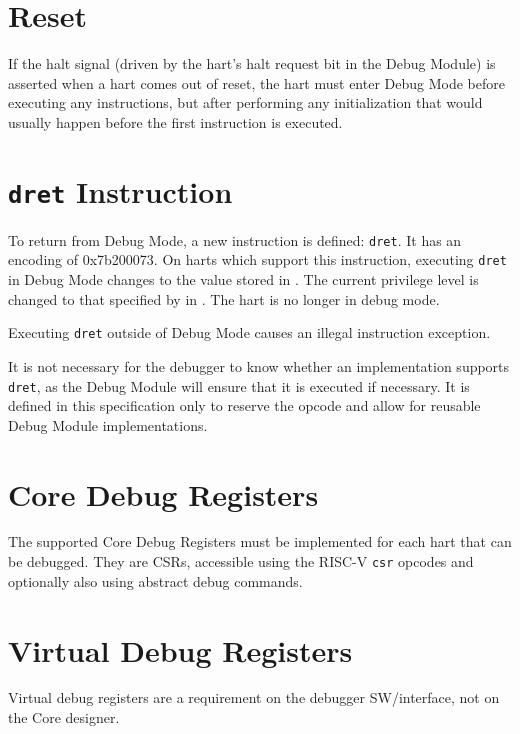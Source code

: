 \section{Reset}

If the halt signal (driven by the hart's halt request bit in the Debug Module)
is asserted when a hart comes out of reset, the hart must
enter Debug Mode before executing any instructions, but after performing any
initialization that would usually happen before the first instruction is
executed.

\section{{\tt dret} Instruction} \label{dret}

To return from Debug Mode, a new instruction is defined: {\tt dret}. It has an
encoding of 0x7b200073. On harts which support this instruction,
executing {\tt dret} in Debug Mode changes \Rpc to the value
stored in \Rdpc. The current privilege level is changed to that specified by
\Fprv in \Rdcsr. The hart is no longer in debug mode.

Executing {\tt dret} outside of Debug Mode causes an illegal instruction exception.

It is not necessary for the debugger to know whether an implementation supports
{\tt dret}, as the Debug Module will ensure that it is executed if necessary.
It is defined in this specification only to reserve the opcode and
allow for reusable Debug Module implementations.

\section{Core Debug Registers} \label{debreg}

The supported Core Debug Registers must be implemented for each hart that can
be debugged. They are CSRs, accessible using the RISC-V {\tt csr} opcodes and
optionally also using abstract debug commands.



\section{Virtual Debug Registers} \label{virtreg}

Virtual debug registers are a requirement on the debugger SW/interface,
not on the Core designer.


